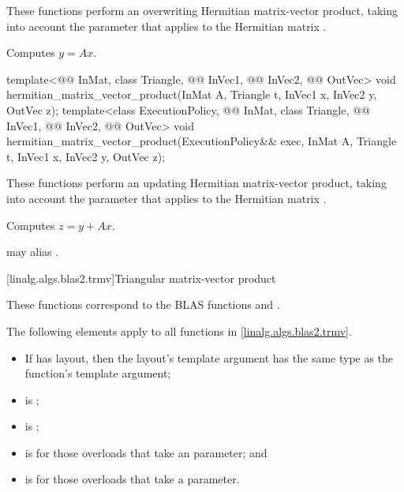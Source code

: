 \begin{itemdescr}
\pnum
These functions perform an overwriting Hermitian matrix-vector product,
taking into account the  parameter
that applies to the Hermitian matrix .

\pnum
\effects
Computes $y = A x$.
\end{itemdescr}

\begin{itemdecl}
template<@@ InMat, class Triangle, @@ InVec1, @@ InVec2, @@ OutVec>
  void hermitian_matrix_vector_product(InMat A, Triangle t, InVec1 x, InVec2 y, OutVec z);
template<class ExecutionPolicy,
         @@ InMat, class Triangle, @@ InVec1, @@ InVec2, @@ OutVec>
  void hermitian_matrix_vector_product(ExecutionPolicy&& exec,
                                       InMat A, Triangle t, InVec1 x, InVec2 y, OutVec z);
\end{itemdecl}

\begin{itemdescr}
\pnum
These functions perform an updating Hermitian matrix-vector product,
taking into account the  parameter
that applies to the Hermitian matrix .

\pnum
\effects
Computes $z = y + A x$.

\pnum
\remarks
{} may alias .
\end{itemdescr}

[linalg.algs.blas2.trmv]{Triangular matrix-vector product}

\pnum
\begin{note}
These functions correspond to the BLAS functions
 and \supercite{blas2}.
\end{note}

\pnum
The following elements apply to all functions in \ref{linalg.algs.blas2.trmv}.

\pnum
\mandates
\begin{itemize}
\item
If  has  layout,
then the layout's  template argument has
the same type as the function's  template argument;
\item
{}
is ;
\item
{}
is ;
\item
{}
is  for those overloads that take an  parameter; and
\item
{}
is  for those overloads that take a  parameter.
\end{itemize}


